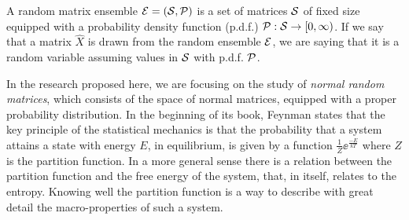 \documentclass[12pt]{report}
\begin{document}
\begin{definition}
	A random matrix ensemble $\mathcal{E} = (\mathcal{S}, \mathcal{P})$ is a set of matrices $\mathcal{S}$ of fixed size equipped with a probability density function (p.d.f.) $\mathcal{P}: \mathcal{S} \rightarrow [0, \infty)$. If we say that a matrix $\hat{X}$ is drawn from the random ensemble $\mathcal{E}$, we are saying that it is a random variable assuming values in $\mathcal{S}$ with p.d.f. $\mathcal{P}$.
	\label{Def: Ensemble}
\end{definition}

In the research proposed here, we are focusing on the study of {\it normal random matrices}, which consists of the space of normal matrices, equipped with a proper probability distribution. In the beginning of its book, Feynman states \cite{feynmanstatistical} that the key principle of the statistical mechanics is that the probability that a system attains a state with energy $E$, in equilibrium, is given by a function $\frac{1}{Z} \ee^{\frac{-E}{kT}}$ where $Z$ is the partition function. In a more general sense there is a relation between the partition function and the free energy of the system, that, in itself, relates to the entropy. Knowing well the partition function is a way to describe with great detail the macro-properties of such a system.
\end{document}
